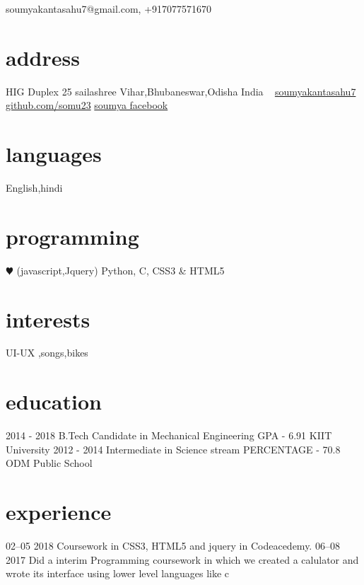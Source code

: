 \documentclass[]{friggeri-cv}
\begin{document}
       {soumyakantasahu7@gmail.com, +917077571670}


\begin{aside}
  \section{address}
    HIG Duplex 25
    sailashree Vihar,Bhubaneswar,Odisha
    India
    ~
    \href{mailto:soumyakantasahu7@gmail.com}{soumyakantasahu7}
    \href{https://github.com/somu23}{github.com/somu23}
    \href{https://www.facebook.com/profile.php?id=100008277437917}{soumya facebook}
  \section{languages}
  English,hindi
  \section{programming}
    {\color{red} $\varheartsuit$}
    (javascript,Jquery)
    Python, C, 
    CSS3 \& HTML5
\end{aside}

\section{interests}
    {UI-UX ,songs,bikes}
\section{education}

\begin{entrylist}
  \entry
    {2014 - 2018}
    {B.Tech {\normalfont Candidate in Mechanical Engineering}}
    {GPA - 6.91}
    {KIIT University}
  \entry
    {}
    {}
    {}
    {}
  \entry
    {2012 - 2014}
    {Intermediate {\normalfont in Science stream}}
    {PERCENTAGE - 70.8 }
    {ODM Public School}
\end{entrylist}

\section{experience}

\begin{entrylist}
  \entry
    {02–05 2018}
    {Coursework in CSS3, HTML5 and jquery in Codeacedemy. }
    {}
    {\emph{}}
  \entry
    {06–08 2017}
    {Did a interim Programming coursework in which we created a calulator and wrote its interface using lower level languages like c}
    {}
    {\emph{}}
\end{entrylist}
\end{document}
